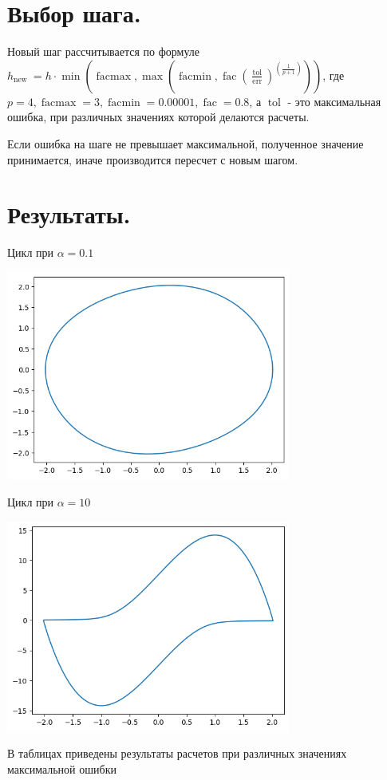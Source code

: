 \documentclass{article}
\DeclareMathOperator{\facmin}{facmin}
\DeclareMathOperator{\facmax}{facmax}
\DeclareMathOperator{\fac}{fac}
\DeclareMathOperator{\tol}{tol}
\DeclareMathOperator{\err}{err}
\begin{document}
\section{Выбор шага.}
Новый шаг рассчитывается по формуле $h_{\text {new }}=h \cdot \min(\facmax, \max(\facmin, \fac(\frac{\tol}{\err})^{(\frac{1}{p+1})})) $, где $p = 4, \facmax = 3, \facmin = 0.00001, \fac = 0.8$, а $\tol$ - это максимальная ошибка, при различных значениях которой делаются расчеты.

Если ошибка на шаге не превышает максимальной, полученное значение принимается, иначе производится пересчет с новым шагом.
\section{Результаты.}

Цикл при $\alpha = 0.1$

\includegraphics[width=0.7\textwidth]{alpha01}

Цикл при $\alpha = 10$

\includegraphics[width=0.7\textwidth]{alpha10}

В таблицах приведены результаты расчетов при различных значениях максимальной ошибки
\end{document}
